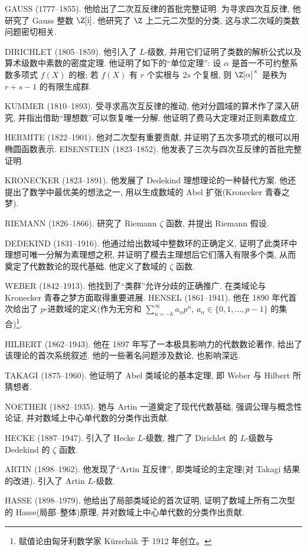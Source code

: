 GAUSS (1777--1855). 他给出了二次互反律的首批完整证明. 为寻求四次互反律, 他研究了 Gauss 整数 $\Z[\mathrm{i}]$. 他研究了 $\Z$ 上二元二次型的分类, 这与求二次域的类数问题密切相关.

DIRICHLET (1805--1859). 他引入了 $L$-级数, 并用它们证明了类数的解析公式以及算术级数中素数的密度定理. 他证明了如下的``单位定理'': 设 $\alpha$ 是首一不可约整系数多项式 $f(X)$ 的根; 若 $f(X)$ 有 $r$ 个实根与 $2s$ 个复根, 则 $\Z[\alpha]^{\times}$ 是秩为 $r + s - 1$ 的有限生成群.

KUMMER (1810--1893). 受寻求高次互反律的推动, 他对分圆域的算术作了深入研究, 并指出借助``理想数''可以恢复唯一分解. 他证明了费马大定理对正则素数成立.

HERMITE (1822--1901). 他对二次型有重要贡献, 并证明了五次多项式的根可以用椭圆函数表示. EISENSTEIN (1823--1852). 他发表了三次与四次互反律的首批完整证明.

KRONECKER (1823--1891). 他发展了 Dedekind 理想理论的一种替代方案. 他还提出了数学中最优美的想法之一, 用以生成数域的 Abel 扩张(Kronecker 青春之梦).

RIEMANN (1826--1866). 研究了 Riemann $\zeta$ 函数, 并提出 Riemann 假设.

DEDEKIND (1831--1916). 他通过给出数域中整数环的正确定义, 证明了此类环中理想可唯一分解为素理想之积, 并证明了模去主理想后它们落入有限多个类, 从而奠定了代数数论的现代基础. 他定义了数域的 $\zeta$ 函数.

WEBER (1842--1913). 他找到了``类群''允许分歧的正确推广. 在类域论与 Kronecker 青春之梦方面取得重要进展. HENSEL (1861--1941). 他在 1890 年代首次给出了 $p$-进数域的定义(作为无穷和 $\sum_{n=-k}^{\infty} a_{n}p^{n}$, $a_{n} \in \{0,1,\ldots,p-1\}$ 的集合)\footnote{赋值论由匈牙利数学家 K\"ursch\'ak 于 1912 年创立。}.

HILBERT (1862--1943). 他在 1897 年写了一本极具影响力的代数数论著作, 给出了该理论的首次系统叙述. 他的一些著名问题涉及数论, 也影响深远.

TAKAGI (1875--1960). 他证明了 Abel 类域论的基本定理, 即 Weber 与 Hilbert 所猜想者.

NOETHER (1882--1935). 她与 Artin 一道奠定了现代代数基础, 强调公理与概念性论证, 并对数域上中心单代数的分类作出贡献.

HECKE (1887--1947). 引入了 Hecke $L$-级数, 推广了 Dirichlet 的 $L$-级数与 Dedekind 的 $\zeta$ 函数.

ARTIN (1898--1962). 他发现了``Artin 互反律'', 即类域论的主定理(对 Takagi 结果的改进). 引入了 Artin $L$-级数.

HASSE (1898--1979). 他给出了局部类域论的首次证明, 证明了数域上所有二次型的 Hasse(局部--整体)原理, 并对数域上中心单代数的分类作出贡献.

